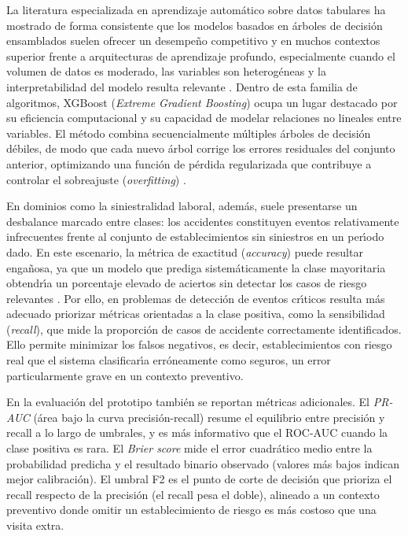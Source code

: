 La literatura especializada en aprendizaje autom\'atico sobre datos tabulares ha mostrado de forma consistente que los modelos basados en \'arboles de decisi\'on ensamblados suelen ofrecer un desempe\~no competitivo y en muchos contextos superior frente a arquitecturas de aprendizaje profundo, especialmente cuando el volumen de datos es moderado, las variables son heterog\'eneas y la interpretabilidad del modelo resulta relevante \parencite{grinsztajn2022}. Dentro de esta familia de algoritmos, XGBoost (\emph{Extreme Gradient Boosting}) ocupa un lugar destacado por su eficiencia computacional y su capacidad de modelar relaciones no lineales entre variables. El m\'etodo combina secuencialmente m\'ultiples \'arboles de decisi\'on d\'ebiles, de modo que cada nuevo \'arbol corrige los errores residuales del conjunto anterior, optimizando una funci\'on de p\'erdida regularizada que contribuye a controlar el sobreajuste (\emph{overfitting}) \parencite{chen2016}.

En dominios como la siniestralidad laboral, adem\'as, suele presentarse un desbalance marcado entre clases: los accidentes constituyen eventos relativamente infrecuentes frente al conjunto de establecimientos sin siniestros en un per\'{\i}odo dado. En este escenario, la m\'etrica de exactitud (\emph{accuracy}) puede resultar enga\~nosa, ya que un modelo que prediga sistem\'aticamente la clase mayoritaria obtendr\'{\i}a un porcentaje elevado de aciertos sin detectar los casos de riesgo relevantes \parencite{he2009}. Por ello, en problemas de detecci\'on de eventos cr\'{\i}ticos resulta m\'as adecuado priorizar m\'etricas orientadas a la clase positiva, como la sensibilidad (\emph{recall}), que mide la proporci\'on de casos de accidente correctamente identificados. Ello permite minimizar los falsos negativos, es decir, establecimientos con riesgo real que el sistema clasificar\'{\i}a err\'oneamente como seguros, un error particularmente grave en un contexto preventivo.

En la evaluaci\'on del prototipo tambi\'en se reportan m\'etricas adicionales. El \emph{PR-AUC} (\'area bajo la curva precisi\'on-recall) resume el equilibrio entre precisi\'on y recall a lo largo de umbrales, y es m\'as informativo que el ROC-AUC cuando la clase positiva es rara. El \emph{Brier score} mide el error cuadr\'atico medio entre la probabilidad predicha y el resultado binario observado (valores m\'as bajos indican mejor calibraci\'on). El umbral F2 es el punto de corte de decisi\'on que prioriza el recall respecto de la precisi\'on (el recall pesa el doble), alineado a un contexto preventivo donde omitir un establecimiento de riesgo es m\'as costoso que una visita extra.


